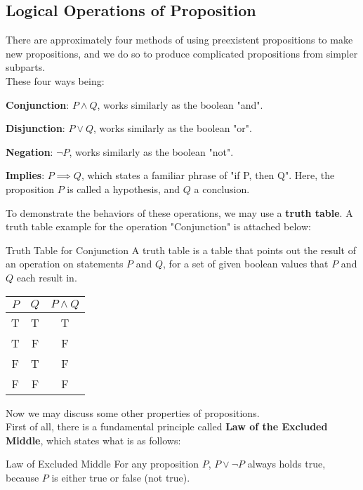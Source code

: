 \subsection{Logical Operations of Proposition}
There are approximately four methods of using preexistent propositions to make new propositions, and we do so to produce complicated propositions from simpler subparts. \\
These four ways being:
\begin{bindenum}
    \item \textbf{Conjunction}: $P \land Q$, works similarly as the boolean "and".
    \item \textbf{Disjunction}: $P \lor Q$, works similarly as the boolean "or".
    \item \textbf{Negation}: $\neg P$, works similarly as the boolean "not".
    \item \textbf{Implies}: $P \implies Q$, which states a familiar phrase of "if P, then Q". Here, the proposition $P$ is called a hypothesis, and $Q$ a conclusion.
\end{bindenum}
To demonstrate the behaviors of these operations, we may use a \textbf{truth table}. A truth table example for the operation "Conjunction" is attached below:
\begin{ln-fig}{Truth Table for Conjunction}{}
    A truth table is a table that points out the result of an operation on statements $P$ and $Q$, for a set of given boolean values that $P$ and $Q$ each result in.
    \begin{center}
        \begin{tabular}{c c||c}
            $P$ & $Q$ & $P \land Q$ \\
            \hline
            T & T & T \\
            \hline
            T & F & F \\
            \hline
            F & T & F \\
            \hline
            F & F & F
        \end{tabular}
    \end{center}
\end{ln-fig}
Now we may discuss some other properties of propositions. \\
First of all, there is a fundamental principle called \textbf{Law of the Excluded Middle}, which states what is as follows:
\begin{ln-axiom}{Law of Excluded Middle}{}
    For any proposition $P$, $P \lor \neg P$ always holds true, because $P$ is either true or false (not true).
\end{ln-axiom}
